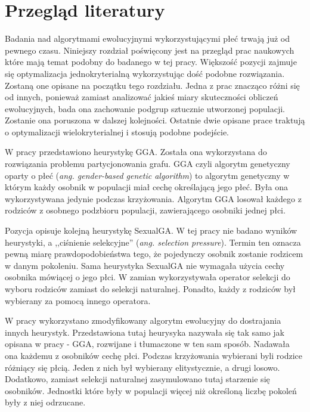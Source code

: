 \documentclass[./FM_mgr.tex]{subfiles}
\begin{document}
\chapter{Przegląd literatury} \label{chapter:literature}

Badania nad algorytmami ewolucyjnymi wykorzystującymi płeć trwają już od pewnego czasu.
Niniejszy rozdział poświęcony jest na przegląd prac naukowych które mają temat podobny do badanego w tej pracy.
Większość pozycji zajmuje się optymalizacja jednokryterialną wykorzystując dość podobne rozwiązania.
Zostaną one opisane na początku tego rozdziału.
Jedna z prac znacząco różni się od innych, ponieważ zamiast analizować jakieś miary skuteczności obliczeń ewolucyjnych, bada ona zachowanie podgrup sztucznie utworzonej populacji.
Zostanie ona poruszona w dalszej kolejności.
Ostatnie dwie opisane prace traktują o optymalizacji wielokryterialnej i stosują podobne podejście.


W pracy \cite{GGA} przedstawiono heurystykę GGA.
Została ona wykorzystana do rozwiązania problemu partycjonowania grafu.
GGA czyli algorytm genetyczny oparty o płeć (\emph{ang. gender-based genetic algorithm}) to algorytm genetyczny w którym każdy osobnik w populacji miał cechę określającą jego płeć.
Była ona wykorzystywana jedynie podczas krzyżowania.
Algorytm GGA losował każdego z rodziców z osobnego podzbioru populacji, zawierającego osobniki jednej płci.

Pozycja \cite{SexualGA} opisuje kolejną heurystykę SexualGA.
W tej pracy nie badano wyników heurystyki, a ,,ciśnienie selekcyjne'' (\emph{ang. selection pressure}).
Termin ten oznacza pewną miarę prawdopodobieństwa tego, że pojedynczy osobnik zostanie rodzicem w danym pokoleniu.
Sama heurystyka SexualGA nie wymagała użycia cechy osobnika mówiącej o jego płci.
W zamian wykorzystywała operator selekcji do wyboru rodziców zamiast do selekcji naturalnej.
Ponadto, każdy z rodziców był wybierany za pomocą innego operatora.

W pracy \cite{ansotegui} wykorzystano zmodyfikowany algorytm ewolucyjny do dostrajania innych heurystyk.
Przedstawiona tutaj heurysyka nazywała się tak samo jak opisana w pracy \cite{GGA} - GGA, rozwijane i tłumaczone w ten sam sposób.
Nadawała ona każdemu z osobników cechę płci.
Podczas krzyżowania wybierani byli rodzice różniący się płcią.
Jeden z nich był wybierany elitystycznie, a drugi losowo.
Dodatkowo, zamiast selekcji naturalnej zasymulowano tutaj starzenie się osobników.
Jednostki które były w populacji więcej niż określoną liczbę pokoleń były z niej odrzucane.
\end{document}
